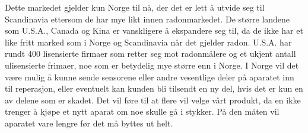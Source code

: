 Dette markedet gjelder kun Norge til nå, der det er lett å utvide seg til Scandinavia ettersom de har mye likt innen radonmarkedet. De større landene som U.S.A., Canada og Kina er vanskligere å ekspandere seg til, da de ikke har et like fritt marked som i Norge og Scandinavia når det gjelder radon. U.S.A. har rundt 400 lisensierte firmaer som retter seg mot radonmålere og et ukjent antall ulisensierte frimaer, noe som er betydelig mye større enn i Norge. I Norge vil det være mulig å kunne sende sensorene eller andre vesentlige deler på aparatet inn til reperasjon, eller eventuelt kan kunden bli tilsendt en ny del, hvis det er kun en av delene som er skadet. Det vil føre til at flere vil velge vårt produkt, da en ikke trenger å kjøpe et nytt aparat om noe skulle gå i stykker. På den måten vil aparatet vare lengre før det må byttes ut helt. 




